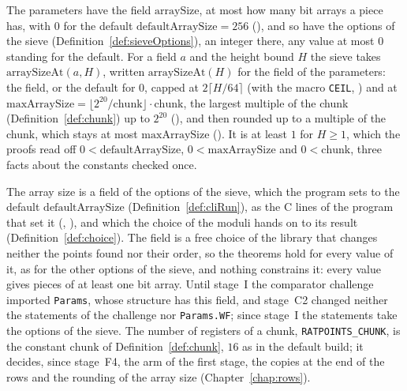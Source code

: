 \begin{definition}\label{def:arraySize}
  \leanok
  The parameters have the field $\mathrm{arraySize}$, at most how many bit arrays a piece has, with
  $0$ for the default $\mathrm{defaultArraySize} = 256$ (), and so
  have the options of the sieve (Definition~\ref{def:sieveOptions}), an integer there, any value at
  most $0$ standing for the default. For a field $a$ and the height bound $H$ the sieve takes
  $\mathrm{arraySizeAt}(a, H)$, written $\mathrm{arraySizeAt}(H)$ for the field of the parameters:
  the field, or the default for $0$, capped at $2 \lceil H/64 \rceil$ (with the macro \verb|CEIL|,
  ) and at
  $\mathrm{maxArraySize} = \lfloor 2^{20}/\mathrm{chunk} \rfloor \cdot \mathrm{chunk}$, the largest
  multiple of the chunk (Definition~\ref{def:chunk}) up to $2^{20}$
  (), and then rounded up to a multiple of the chunk, which stays
  at most $\mathrm{maxArraySize}$ (). It is at least $1$ for
  $H \ge 1$, which the proofs read off $0 < \mathrm{defaultArraySize}$, $0 < \mathrm{maxArraySize}$
  and $0 < \mathrm{chunk}$, three facts about the constants checked once.
\end{definition}

The array size is a field of the options of the sieve, which the program sets to the default
$\mathrm{defaultArraySize}$ (Definition~\ref{def:cliRun}), as the C lines of the program that set it
(, ), and which the choice of the moduli hands
on to its result (Definition~\ref{def:choice}). The field is a free choice of the library that
changes neither the points found nor their order, so the theorems hold for every value of it, as for
the other options of the sieve, and nothing constrains it: every value gives pieces of at least one
bit array. Until stage~I the comparator challenge imported \verb|Params|, whose structure has this
field, and stage~C2 changed neither the statements of the challenge nor \verb|Params.WF|; since
stage~I the statements take the options of the sieve. The number of registers of a chunk,
\verb|RATPOINTS_CHUNK|, is the constant $\mathrm{chunk}$ of Definition~\ref{def:chunk}, $16$ as in
the default build; it decides, since stage~F4, the arm of the first stage, the copies at the end of
the rows and the rounding of the array size (Chapter~\ref{chap:rows}).

